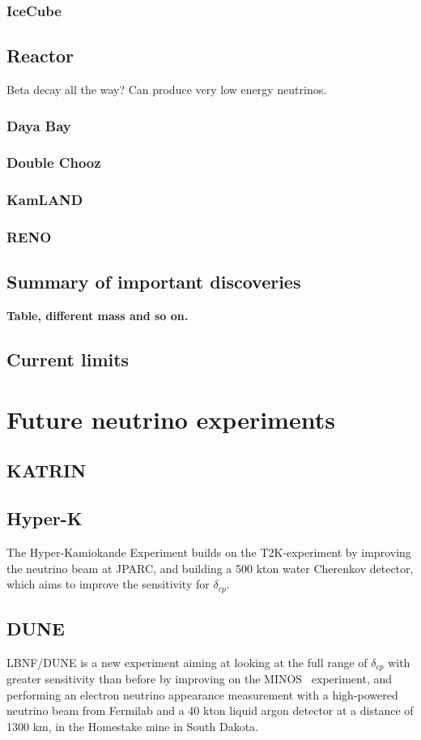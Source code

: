 \subsubsection{IceCube}

\subsection{Reactor}
Beta decay all the way? Can produce very low energy neutrinos. 


\subsubsection{Daya Bay}
\subsubsection{Double Chooz}
\subsubsection{KamLAND}
\subsubsection{RENO}

\subsection{Summary of important discoveries}
\textbf{Table, different mass and so on.}
\subsection{Current limits}

\section{Future neutrino experiments}
\subsection{KATRIN}
\subsection{Hyper-K}
The Hyper-Kamiokande Experiment\cite{24HyperK}  builds on the T2K-experiment\cite{21T2K} by improving the neutrino beam at JPARC, and building a 500 kton water Cherenkov detector, which aims to improve the sensitivity for $\delta_{cp}$.
\subsection{DUNE}
LBNF/DUNE\cite{23DUNE} is a new experiment aiming at looking at the full range of $\delta_{cp}$ with greater sensitivity than before by improving on the MINOS~\cite{MINOS} experiment, and performing an electron neutrino appearance measurement with a high-powered neutrino beam from Fermilab and a 40 kton liquid argon detector at a distance of 1300 km, in the Homestake mine in South Dakota.
